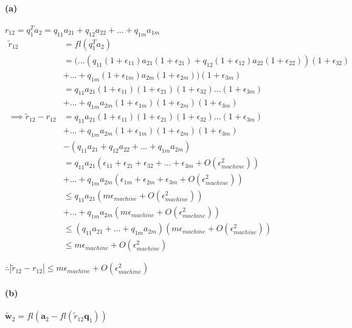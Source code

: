 \documentclass[12pt, letterpaper]{article}
\begin{document}
\paragraph{(a)} $r_{12} = q_1^Ta_2 = q_{11}a_{21} + q_{12}a_{22} + ... + q_{1m}a_{1m}$
\begin{align*}
  \tilde{r}_{12} &= fl(q_1^Ta_2)\\
                &= (...(q_{11}(1 + \epsilon_{11})a_{21}(1 + \epsilon_{21})
                   + q_{12}(1 + \epsilon_{12})a_{22}(1 + \epsilon_{22}))(1 + \epsilon_{32})\\
                &+ ... + q_{1m}(1 + \epsilon_{1m})a_{2m}(1 + \epsilon_{2m}))(1 + \epsilon_{3m})\\
                &= q_{11}a_{21}(1 + \epsilon_{11})(1 + \epsilon_{21})(1 + \epsilon_{32})...(1 + \epsilon_{3m})\\
                &+ ... + q_{1m}a_{2m}(1 + \epsilon_{1m})(1 + \epsilon_{2m})(1 + \epsilon_{3m})\\
  \implies \tilde{r}_{12}- r_{12} &= q_{11}a_{21}(1 + \epsilon_{11})(1 + \epsilon_{21})(1 + \epsilon_{32})...(1 + \epsilon_{3m})\\
                &+ ... + q_{1m}a_{2m}(1 + \epsilon_{1m})(1 + \epsilon_{2m})(1 + \epsilon_{3m})\\
                &- (q_{11}a_{21} + q_{12}a_{22} + ... + q_{1m}a_{2m})\\
                &= q_{11}a_{21}(\epsilon_{11} + \epsilon_{21} + \epsilon_{32} + ... + \epsilon_{3m} + O(\epsilon_{machine}^2))\\
                &+ ... + q_{1m}a_{2m}(\epsilon_{1m} + \epsilon_{2m} + \epsilon_{3m} + O(\epsilon_{machine}^2))\\
                &\leq q_{11}a_{21}(m\epsilon_{machine} + O(\epsilon_{machine}^2))\\
                &+ ... + q_{1m}a_{2m}(m\epsilon_{machine} + O(\epsilon_{machine}^2))\\
                &\leq (q_{11}a_{21} + ... + q_{1m}a_{2m})(m\epsilon_{machine} + O(\epsilon_{machine}^2))\\
                &\leq m\epsilon_{machine} + O(\epsilon_{machine}^2)
\end{align*}

$\therefore \boxed{|\tilde{r}_{12} - r_{12}| \leq m\epsilon_{machine} + O(\epsilon_{machine}^2)}$

\paragraph{(b)} $\tilde{\mathbf{w}}_2 = fl(\mathbf{a}_2 - fl(\tilde{r}_{12}\mathbf{q}_1))$
\end{document}
